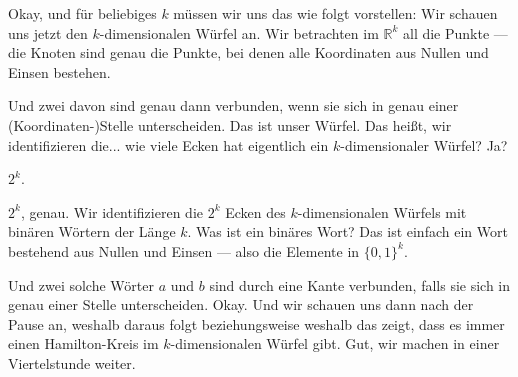 \begin{math-stroke}
\begin{center}
\end{center}
\end{math-stroke}

\begin{spoken-clean}[00:41:24 - 00:42:44]
Okay, und für beliebiges $k$ müssen wir uns das wie folgt vorstellen: Wir schauen uns jetzt den $k$-dimensionalen Würfel an. Wir betrachten im $\mathbb{R}^k$ all die Punkte --- die Knoten sind genau die Punkte, bei denen alle Koordinaten aus Nullen und Einsen bestehen.

Und zwei davon sind genau dann verbunden, wenn sie sich in genau einer (Koordinaten-)Stelle unterscheiden. Das ist unser Würfel. Das heißt, wir identifizieren die... wie viele Ecken hat eigentlich ein $k$-dimensionaler Würfel? Ja?
\end{spoken-clean}

\begin{student-interaction}
$2^k$.
\end{student-interaction}

\begin{spoken-clean}[00:42:44 - 00:43:45]
$2^k$, genau. Wir identifizieren die $2^k$ Ecken des $k$-dimensionalen Würfels mit binären Wörtern der Länge $k$. Was ist ein binäres Wort? Das ist einfach ein Wort bestehend aus Nullen und Einsen --- also die Elemente in $\{0, 1\}^k$.

Und zwei solche Wörter $a$ und $b$ sind durch eine Kante verbunden, falls sie sich in genau einer Stelle unterscheiden. Okay. Und wir schauen uns dann nach der Pause an, weshalb daraus folgt beziehungsweise weshalb das zeigt, dass es immer einen Hamilton-Kreis im $k$-dimensionalen Würfel gibt. Gut, wir machen in einer Viertelstunde weiter.
\end{spoken-clean}

